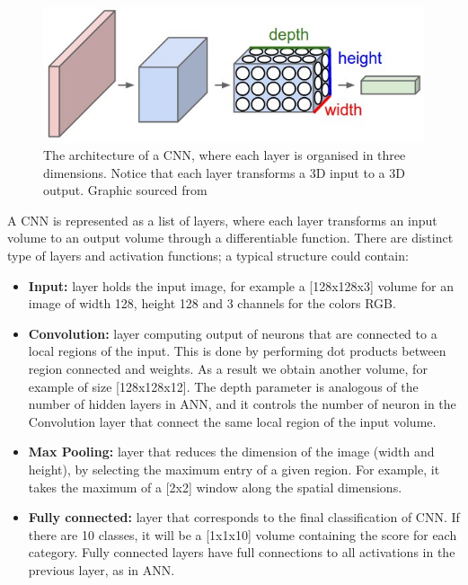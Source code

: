 \begin{figure}[htbp]
	\centering
	\includegraphics[scale=0.5]{cnn.png}
	\caption{The architecture of a CNN, where each layer is organised in three dimensions. Notice that each layer transforms a 3D input to a 3D output. Graphic sourced from \cite{CS231n}}
	\label{CNN}
\end{figure}
\vspace{0.3cm}
A CNN is represented as a list of layers, where each layer transforms an input volume to an output volume through a differentiable function. There are distinct type of layers and activation functions; a typical structure could contain:
\begin{itemize}
	\item \textbf{Input:} layer holds the input image, for example a [128x128x3] volume for an image of width 128, height 128 and 3 channels for the colors RGB. 
	\item \textbf{Convolution:} layer computing output of neurons that are connected to a local regions of the input. This is done by performing dot products between region connected and weights. As a result we obtain another volume, for example of size [128x128x12]. The depth parameter is analogous of the number of hidden layers in ANN, and it controls the number of neuron in the Convolution layer that connect the same local region of the input volume. 
	\item \textbf{Max Pooling:} layer that reduces the dimension of the image (width and height), by selecting the maximum entry of a given region. For example, it takes the maximum of a [2x2] window along the spatial dimensions.
	\item \textbf{Fully connected:} layer that corresponds to the final classification of CNN. If there are 10 classes, it will be a [1x1x10] volume containing the score for each category. Fully connected layers have full connections to all activations in the previous layer, as in ANN. 
\end{itemize}

